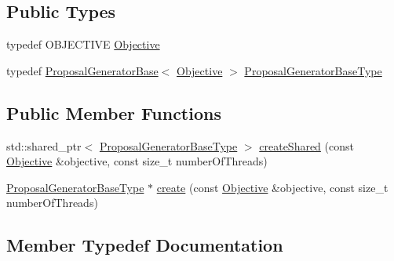 \subsection*{Public Types}
\begin{DoxyCompactItemize}
\item 
typedef O\+B\+J\+E\+C\+T\+I\+V\+E \hyperlink{classnifty_1_1graph_1_1optimization_1_1lifted__multicut_1_1PyProposalGeneratorFactoryBase_a6cd2fe94f2e1dce07f0ab28c16263dc1}{Objective}
\item 
typedef \hyperlink{classnifty_1_1graph_1_1optimization_1_1lifted__multicut_1_1ProposalGeneratorBase}{Proposal\+Generator\+Base}$<$ \hyperlink{classnifty_1_1graph_1_1optimization_1_1lifted__multicut_1_1PyProposalGeneratorFactoryBase_a6cd2fe94f2e1dce07f0ab28c16263dc1}{Objective} $>$ \hyperlink{classnifty_1_1graph_1_1optimization_1_1lifted__multicut_1_1PyProposalGeneratorFactoryBase_affbd94e6d8785c16cf5f6f01de4402de}{Proposal\+Generator\+Base\+Type}
\end{DoxyCompactItemize}
\subsection*{Public Member Functions}
\begin{DoxyCompactItemize}
\item 
std\+::shared\+\_\+ptr$<$ \hyperlink{classnifty_1_1graph_1_1optimization_1_1lifted__multicut_1_1ProposalGeneratorFactoryBase_a0742c3a5da3f5d887e790cfffe5fa026}{Proposal\+Generator\+Base\+Type} $>$ \hyperlink{classnifty_1_1graph_1_1optimization_1_1lifted__multicut_1_1PyProposalGeneratorFactoryBase_afe3339cb430e5b294c0addaaff650967}{create\+Shared} (const \hyperlink{classnifty_1_1graph_1_1optimization_1_1lifted__multicut_1_1PyProposalGeneratorFactoryBase_a6cd2fe94f2e1dce07f0ab28c16263dc1}{Objective} \&objective, const size\+\_\+t number\+Of\+Threads)
\item 
\hyperlink{classnifty_1_1graph_1_1optimization_1_1lifted__multicut_1_1ProposalGeneratorFactoryBase_a0742c3a5da3f5d887e790cfffe5fa026}{Proposal\+Generator\+Base\+Type} $\ast$ \hyperlink{classnifty_1_1graph_1_1optimization_1_1lifted__multicut_1_1PyProposalGeneratorFactoryBase_a1fa704fcf3dba6957f65872ff96c00b8}{create} (const \hyperlink{classnifty_1_1graph_1_1optimization_1_1lifted__multicut_1_1PyProposalGeneratorFactoryBase_a6cd2fe94f2e1dce07f0ab28c16263dc1}{Objective} \&objective, const size\+\_\+t number\+Of\+Threads)
\end{DoxyCompactItemize}


\subsection{Member Typedef Documentation}
\hypertarget{classnifty_1_1graph_1_1optimization_1_1lifted__multicut_1_1PyProposalGeneratorFactoryBase_a6cd2fe94f2e1dce07f0ab28c16263dc1}{}

